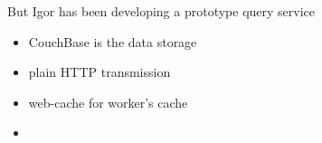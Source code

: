 \documentclass[aspectratio=169]{beamer}
\begin{document}
\begin{frame}{But Igor has been developing a prototype query service}
\Large
\vspace{0.5 cm}
\begin{itemize}
\item CouchBase is the data storage
\item plain HTTP transmission
\item web-cache for worker's cache
\item 
\end{itemize}


\end{frame}
\end{document}
